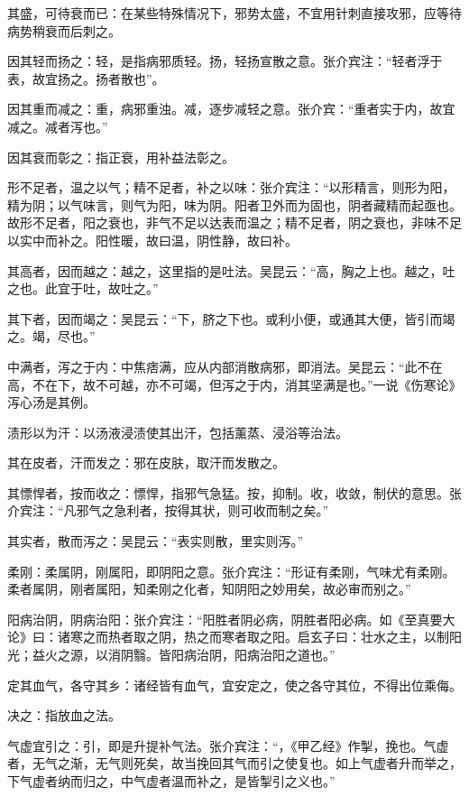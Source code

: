 \documentclass[draft,12pt]{ctexbook}
\begin{document}
\begin{jiaozhu}
  \item 其盛，可待衰而已：在某些特殊情况下，邪势太盛，不宜用针刺直接攻邪，应等待病势稍衰而后刺之。
  \item 因其轻而扬之：轻，是指病邪质轻。扬，轻扬宣散之意。张介宾注：“轻者浮于表，故宜扬之。扬者散也”。
  \item 因其重而减之：重，病邪重浊。减，逐步减轻之意。张介宾：“重者实于内，故宜减之。减者泻也。”
  \item 因其衰而彰之：指正衰，用补益法彰之。
  \item 形不足者，温之以气；精不足者，补之以味：张介宾注：“以形精言，则形为阳，精为阴；以气味言，则气为阳，味为阴。阳者卫外而为固也，阴者藏精而起亟也。故形不足者，阳之衰也，非气不足以达表而温之；精不足者，阴之衰也，非味不足以实中而补之。阳性暖，故曰温，阴性静，故曰补。
  \item 其高者，因而越之：越之，这里指的是吐法。吴昆云：“高，胸之上也。越之，吐之也。此宜于吐，故吐之。”
  \item 其下者，因而竭之：吴昆云：“下，脐之下也。或利小便，或通其大便，皆引而竭之。竭，尽也。”
  \item 中满者，泻之于内：中焦痞满，应从内部消散病邪，即消法。吴昆云：“此不在高，不在下，故不可越，亦不可竭，但泻之于内，消其坚满是也。”一说《伤寒论》泻心汤是其例。
  \item 渍形以为汗：以汤液浸渍使其出汗，包括薰蒸、浸浴等治法。
  \item 其在皮者，汗而发之：邪在皮肤，取汗而发散之。
  \item 其慓悍者，按而收之：慓悍，指邪气急猛。按，抑制。收，收敛，制伏的意思。张介宾注：“凡邪气之急利者，按得其状，则可收而制之矣。”
  \item 其实者，散而泻之：吴昆云：“表实则散，里实则泻。”
  \item 柔刚：柔属阴，刚属阳，即阴阳之意。张介宾注：“形证有柔刚，气味尤有柔刚。柔者属阴，刚者属阳，知柔刚之化者，知阴阳之妙用矣，故必审而别之。”
  \item 阳病治阴，阴病治阳：张介宾注：“阳胜者阴必病，阴胜者阳必病。如《至真要大论》曰：诸寒之而热者取之阴，热之而寒者取之阳。启玄子曰：壮水之主，以制阳光；益火之源，以消阴翳。皆阳病治阴，阳病治阳之道也。”
  \item 定其血气，各守其乡：诸经皆有血气，宜安定之，使之各守其位，不得出位乘侮。
  \item 决之：指放血之法。
  \item 气虚宜引之：引，即是升提补气法。张介宾注：“，《甲乙经》作掣，挽也。气虚者，无气之渐，无气则死矣，故当挽回其气而引之使复也。如上气虚者升而举之，下气虚者纳而归之，中气虚者温而补之，是皆掣引之义也。”
\end{jiaozhu}
\end{document}
